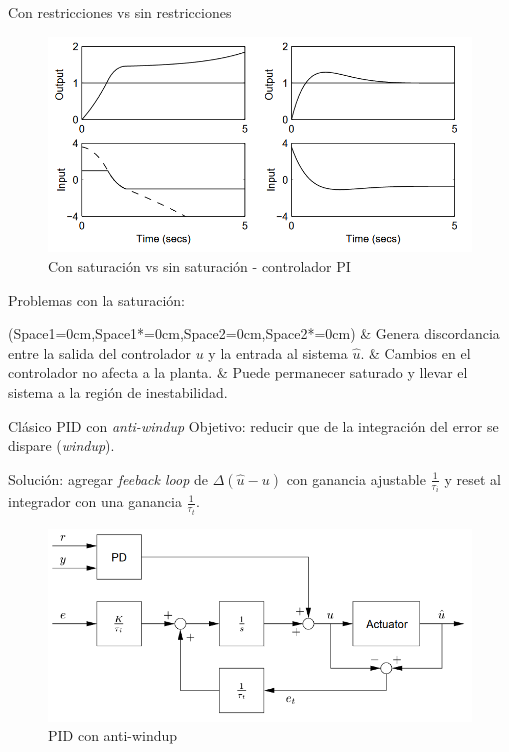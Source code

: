 \documentclass[8pt]{beamer}
\begin{document}
\begin{frame}[fragile]{Con restricciones vs sin restricciones}
	\begin{figure}[!ht]
		\centering
		\includegraphics[width=0.7\linewidth]{figures/Contrained_Unconstrained}
		\caption*{Con saturación vs sin saturación - controlador PI}
	\end{figure}	
	Problemas con la saturación: 
	\Activate
	\begin{easylist}[itemize] \ListProperties(Space1=0cm,Space1*=0cm,Space2=0cm,Space2*=0cm)
		& Genera discordancia entre la salida del controlador $u$ y la entrada al sistema $\hat{u}$.
		& Cambios en el controlador no afecta a la planta.
		& Puede permanecer saturado y llevar el sistema a la región de inestabilidad.	
	\end{easylist}
	\Deactivate
	
\end{frame}

\begin{frame}[fragile]{Clásico PID con \textit{anti-windup}}
	Objetivo: reducir que de la integración del error se dispare (\textit{windup}).
	
	Solución: agregar \textit{feeback loop} de $\Delta(\hat{u}-u)$ con ganancia ajustable $\frac{1}{\tau_i}$ y reset al integrador con una ganancia $\frac{1}{\tau_t}$.
	\begin{figure}[!ht]
		\centering
		\includegraphics[width=0.7\linewidth]{figures/PID_anti-windup}
		\caption*{PID con anti-windup}
	\end{figure}
	
\end{frame}
\end{document}
